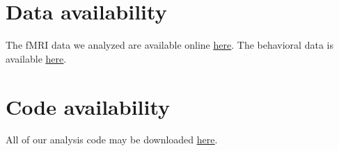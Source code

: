 \documentclass[10pt]{article}
\begin{document}
\section*{Data availability}
The fMRI data we analyzed are available online \href{http://dataspace.princeton.edu/jspui/handle/88435/dsp01nz8062179}{\underline{here}}.  The behavioral data is available  \href{https://github.com/ContextLab/sherlock-topic-model-paper}{\underline{here}}.

\section*{Code availability}
All of our analysis code may be downloaded \href{https://github.com/ContextLab/sherlock-topic-model-paper}{\underline{here}}.

%
%
\end{document}
